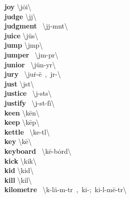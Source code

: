 \documentclass[10pt,a4paper]{article}
\begin{document}
\begin{multicols}{2}
\textbf{ joy }\quad \textbackslash \textprimstress j\.{o}i\textbackslash \\
\textbf{ judge }\quad \textbackslash \textprimstress j\textschwa j\textbackslash \\
\textbf{ judgment }\quad \ \textbackslash \textprimstress j\textschwa j-m\textschwa nt\textbackslash \\
\textbf{ juice }\quad \textbackslash \textprimstress j\"{u}s\textbackslash \\
\textbf{ jump }\quad \textbackslash \textprimstress j\textschwa mp\textbackslash \\
\textbf{ jumper }\quad \ \textbackslash \textprimstress j\textschwa m-p\textschwa r\textbackslash \\
\textbf{ junior }\quad \ \textbackslash \textprimstress j\"{u}n-y\textschwa r\textbackslash \\
\textbf{ jury }\quad \ \textbackslash \textprimstress ju\. r-\={e}\ ,\ \textprimstress j\textschwa r-\textbackslash \\
\textbf{ just }\quad \textbackslash \textprimstress j\textschwa st\textbackslash \\
\textbf{ justice }\quad \ \textbackslash \textprimstress j\textschwa -st\textschwa s\textbackslash \\
\textbf{ justify }\quad \ \textbackslash \textprimstress j\textschwa -st\textschwa -\textsecstress f\={i}\textbackslash \\
\textbf{ keen }\quad \textbackslash \textprimstress k\={e}n\textbackslash \\
\textbf{ keep }\quad \textbackslash \textprimstress k\={e}p\textbackslash \\
\textbf{ kettle }\quad \ \textbackslash \textprimstress ke-t\textsuperscript{\textreve}l\textbackslash \\
\textbf{ key }\quad \textbackslash \textprimstress k\={e}\textbackslash \\
\textbf{ keyboard }\quad \ \textbackslash \textprimstress k\={e}-\textsecstress b\.{o}rd\textbackslash \\
\textbf{ kick }\quad \textbackslash \textprimstress kik\textbackslash \\
\textbf{ kid }\quad \textbackslash \textprimstress kid\textbackslash \\
\textbf{ kill }\quad \textbackslash \textprimstress kil\textbackslash \\
\textbf{ kilometre }\quad \ \textbackslash k\textschwa -\textprimstress l\"{a}-m\textschwa -t\textschwa r\ ,\ ki-;\ \textprimstress ki-l\textschwa -\textsecstress m\={e}-t\textschwa r\textbackslash \\

\end{multicols}
\end{document}
